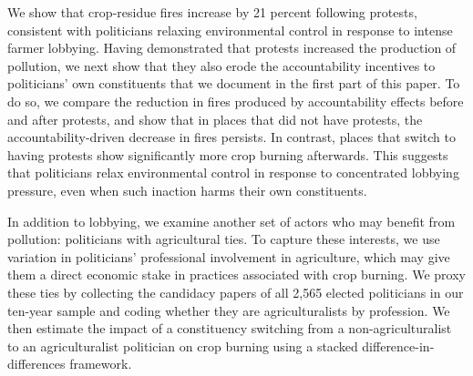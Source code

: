 \documentclass[12pt]{article}
\begin{document}


We show that crop‐residue fires increase by 21 percent following protests, consistent with politicians relaxing environmental control in response to intense farmer lobbying. Having demonstrated that protests increased the production of pollution, we next show that they also erode the accountability incentives to politicians' own constituents that we document in the first part of this paper. To do so, we compare the reduction in fires produced by accountability effects before and after protests, and show that in places that did not have protests, the accountability-driven decrease in fires persists. In contrast, places that switch to having protests show significantly more crop burning afterwards. This suggests that politicians relax environmental control in response to concentrated lobbying pressure, even when such inaction harms their own constituents.


In addition to lobbying, we examine another set of actors who may benefit from pollution: politicians with agricultural ties. To capture these interests, we use variation in politicians’ professional involvement in agriculture, which may give them a direct economic stake in practices associated with crop burning. We proxy these ties by collecting the candidacy papers of all 2,565 elected politicians in our ten-year sample and coding whether they are agriculturalists by profession. We then estimate the impact of a constituency switching from a non-agriculturalist to an agriculturalist politician on crop burning using a stacked difference-in-differences framework.
\end{document}
